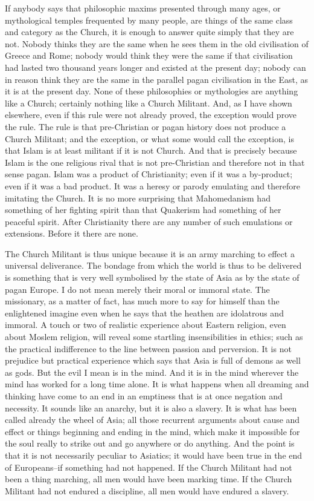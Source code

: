 If anybody says that philosophic maxims presented through many ages, or mythological temples frequented by many people, are things of the same class and category as the Church, it is enough to answer quite simply that they are not. Nobody thinks they are the same when he sees them in the old civilisation of Greece and Rome; nobody would think they were the same if that civilisation had lasted two thousand years longer and existed at the present day; nobody can in reason think they are the same in the parallel pagan civilisation in the East, as it is at the present day. None of these philosophies or mythologies are anything like a Church; certainly nothing like a Church Militant. And, as I have shown elsewhere, even if this rule were not already proved, the exception would prove the rule. The rule is that pre-Christian or pagan history does not produce a Church Militant; and the exception, or what some would call the exception, is that Islam is at least militant if it is not Church. And that is precisely because Islam is the one religious rival that is not pre-Christian and therefore not in that sense pagan. Islam was a product of Christianity; even if it was a by-product; even if it was a bad product. It was a heresy or parody emulating and therefore imitating the Church. It is no more surprising that Mahomedanism had something of her fighting spirit than that Quakerism had something of her peaceful spirit. After Christianity there are any number of such emulations or extensions. Before it there are none.

The Church Militant is thus unique because it is an army marching to effect a universal deliverance. The bondage from which the world is thus to be delivered is something that is very well symbolised by the state of Asia as by the state of pagan Europe. I do not mean merely their moral or immoral state. The missionary, as a matter of fact, has much more to say for himself than the enlightened imagine even when he says that the heathen are idolatrous and immoral. A touch or two of realistic experience about Eastern religion, even about Moslem religion, will reveal some startling insensibilities in ethics; such as the practical indifference to the line between passion and perversion. It is not prejudice but practical experience which says that Asia is full of demons as well as gods. But the evil I mean is in the mind. And it is in the mind wherever the mind has worked for a long time alone. It is what happens when all dreaming and thinking have come to an end in an emptiness that is at once negation and necessity. It sounds like an anarchy, but it is also a slavery. It is what has been called already the wheel of Asia; all those recurrent arguments about cause and effect or things beginning and ending in the mind, which make it impossible for the soul really to strike out and go anywhere or do anything. And the point is that it is not necessarily peculiar to Asiatics; it would have been true in the end of Europeans--if something had not happened. If the Church Militant had not been a thing marching, all men would have been marking time. If the Church Militant had not endured a discipline, all men would have endured a slavery.

